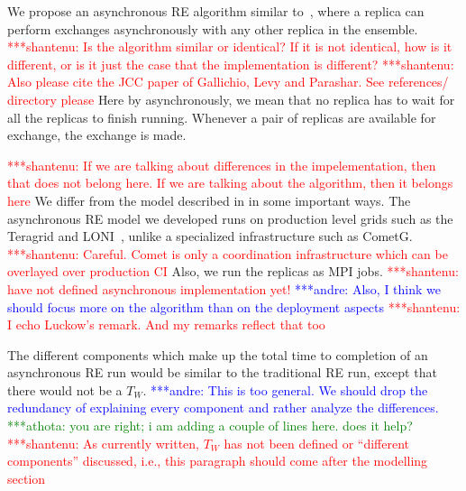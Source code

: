 \documentclass{rspublic}
\newcommand{\jhanote}[1]{ {\textcolor{red} { ***shantenu: #1 }}}
\newcommand{\alnote}[1]{ {\textcolor{blue} { ***andre: #1 }}}
\newcommand{\athotanote}[1]{ {\textcolor{green} { ***athota: #1 }}}
\newcommand{\alnote}[1]{}
\newcommand{\athotanote}[1]{}
\newcommand{\jhanote}[1]{}
\begin{document}

We propose an asynchronous RE algorithm similar
to~\citep{parashar_arepex}, where a replica can perform exchanges
asynchronously with any other replica in the ensemble. \jhanote{Is the
  algorithm similar or identical? If it is not identical, how is it
  different, or is it just the case that the implementation is
  different?}  \jhanote{Also please cite the JCC paper of Gallichio,
  Levy and Parashar. See references/ directory please} Here by
asynchronously, we mean that no replica has to wait for all the
replicas to finish running. Whenever a pair of replicas are available
for exchange, the exchange is made.

\jhanote{If we are talking about differences in the impelementation,
  then that does not belong here. If we are talking about the
  algorithm, then it belongs here} We differ from the model described
in \citep{parashar_arepex} in some important ways.  The asynchronous
RE model we developed runs on production level grids such as the
Teragrid and LONI~\citep{LONI_web}, unlike a specialized
infrastructure such as CometG.  \jhanote{Careful. Comet is only a
  coordination infrastructure which can be overlayed over production
  CI} Also, we run the replicas as MPI jobs. \jhanote{have not defined
  asynchronous implementation yet!}  \alnote{Also, I think we should
  focus more on the algorithm than on the deployment
  aspects}\jhanote{I echo Luckow's remark. And my remarks reflect that
  too}

The different components which make up the total time to completion of
an asynchronous RE run would be similar to the traditional RE run,
except that there would not be a $T_W$. \alnote{This is too general.
  We should drop the redundancy of explaining every component and
  rather analyze the differences.} \athotanote{you are right; i am
  adding a couple of lines here. does it help?} \jhanote{As currently
written, $T_W$ has not been defined or ``different components''
discussed, i.e., this paragraph should come after the modelling
section}



\end{document}
